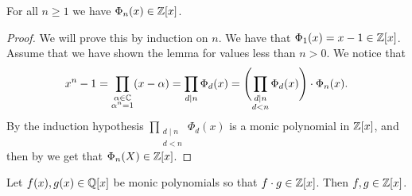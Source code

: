 \documentclass[11pt,a4paper]{article}
\begin{document}
\begin{lemma}
  For all $n \geq 1$ we have $\Phi_n(x) \in \mathbb{Z}[x]$.
\end{lemma}
\begin{proof}
  We will prove this by induction on $n$.
  We have that $\Phi_1(x) = x - 1 \in \mathbb{Z}[x]$.
  Assume that we have shown the lemma for values less than $n > 0$.
  We notice that
  \[
    x^n - 1 =
    \prod_{\substack{\alpha \in \C \\ \alpha^n = 1}} (x - \alpha) =
    \prod_{d \mid n} \Phi_{d}(x) =
    \del[4]{\prod_{\substack{d \mid n \\ d < n}} \Phi_{d}(x)}  \cdot \Phi_n(x).
  \]
  By the induction hypothesis
  $\prod_{\substack{d \mid n \\ d < n}} \Phi_{d}(x)$
  is a monic polynomial in $\mathbb{Z}[x]$,
  and then by 
  we get that $\Phi_n(X) \in \mathbb{Z}[x]$.
\end{proof}

\begin{exercise}
  \label{ex:polynomials}
  Let $f(x),g(x) \in \mathbb{Q}[x]$ be monic polynomials so that $f \cdot g \in \mathbb{Z}[x]$.
  Then $f,g \in \mathbb{Z}[x]$.
\end{exercise}
\end{document}
